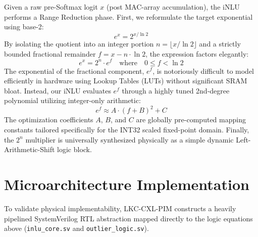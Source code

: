 \documentclass[10pt,conference]{IEEEtran}
\begin{document}
Given a raw pre-Softmax logit $x$ (post MAC-array accumulation), the iNLU performs a Range Reduction phase. First, we reformulate the target exponential using base-2:
\begin{equation}
e^x = 2^{x / \ln 2}
\end{equation}
By isolating the quotient into an integer portion $n = \lfloor x / \ln 2 \rfloor$ and a strictly bounded fractional remainder $f = x - n \cdot \ln 2$, the expression factors elegantly:
\begin{equation}
e^x = 2^n \cdot e^f \quad \text{where} \quad 0 \leq f < \ln 2
\end{equation}
The exponential of the fractional component, $e^f$, is notoriously difficult to model efficiently in hardware using Lookup Tables (LUTs) without significant SRAM bloat. Instead, our iNLU evaluates $e^f$ through a highly tuned 2nd-degree polynomial utilizing integer-only arithmetic:
\begin{equation}
e^f \approx A \cdot (f + B)^2 + C
\end{equation}
The optimization coefficients $A$, $B$, and $C$ are globally pre-computed mapping constants tailored specifically for the INT32 scaled fixed-point domain. Finally, the $2^n$ multiplier is universally synthesized physically as a simple dynamic Left-Arithmetic-Shift logic block.

\section{Microarchitecture Implementation}

To validate physical implementability, LKC-CXL-PIM constructs a heavily pipelined SystemVerilog RTL abstraction mapped directly to the logic equations above (\texttt{inlu\_core.sv} and \texttt{outlier\_logic.sv}). 
\end{document}
